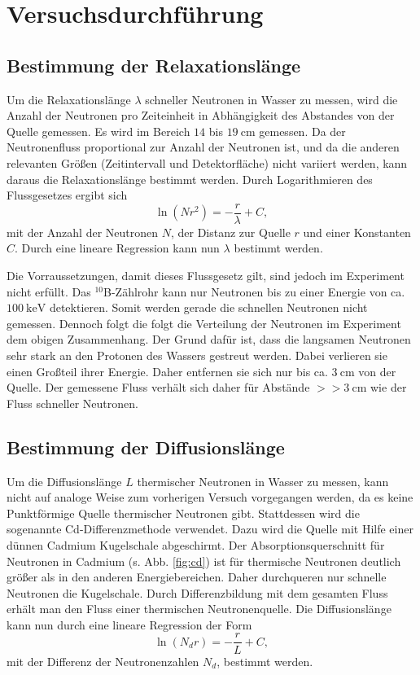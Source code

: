 \section{Versuchsdurchführung}

\subsection{Bestimmung der Relaxationslänge}

Um die Relaxationslänge $\lambda$ schneller Neutronen in Wasser zu messen, wird die Anzahl der Neutronen pro Zeiteinheit in Abhängigkeit des Abstandes von der Quelle gemessen. Es wird im Bereich $14$ bis $\SI{19}{\centi\metre}$ gemessen.
Da der Neutronenfluss proportional zur Anzahl der Neutronen ist, und da die anderen relevanten Größen (Zeitintervall und Detektorfläche) nicht variiert werden, kann daraus die Relaxationslänge bestimmt werden. Durch Logarithmieren des Flussgesetzes ergibt sich
\begin{equation}
 \ln\left(Nr^{2}\right) = -\frac{r}{\lambda} + C,
\end{equation}
mit der Anzahl der Neutronen $N$, der Distanz zur Quelle $r$ und einer Konstanten $C$. Durch eine lineare Regression kann nun $\lambda$ bestimmt werden.

Die Vorraussetzungen, damit dieses Flussgesetz gilt, sind jedoch im Experiment nicht erfüllt. Das $^{10}$B-Zählrohr kann nur Neutronen bis zu einer Energie von ca. $\SI{100}{\kilo\electronvolt}$ detektieren. Somit werden gerade die schnellen Neutronen nicht gemessen. Dennoch folgt die folgt die Verteilung der Neutronen im Experiment dem obigen Zusammenhang.
Der Grund dafür ist, dass die langsamen Neutronen sehr stark an den Protonen des Wassers gestreut werden. Dabei verlieren sie einen Großteil ihrer Energie. Daher entfernen sie sich nur bis ca. $\SI{3}{\centi\metre}$ von der Quelle. 
Der gemessene Fluss verhält sich daher für Abstände $>>\SI{3}{\centi\metre}$ wie der Fluss schneller Neutronen.

\subsection{Bestimmung der Diffusionslänge}

Um die Diffusionslänge $L$ thermischer Neutronen in Wasser zu messen, kann nicht auf analoge Weise zum vorherigen Versuch vorgegangen werden, da es keine Punktförmige Quelle thermischer Neutronen gibt.
Stattdessen wird die sogenannte Cd-Differenzmethode verwendet. Dazu wird die Quelle mit Hilfe einer dünnen Cadmium Kugelschale abgeschirmt. Der Absorptionsquerschnitt für Neutronen in Cadmium (s. Abb. \ref{fig:cd}) ist für thermische Neutronen deutlich größer als in den anderen Energiebereichen. Daher durchqueren nur schnelle Neutronen die Kugelschale.
Durch Differenzbildung mit dem gesamten Fluss erhält man den Fluss einer thermischen Neutronenquelle. Die Diffusionslänge kann nun durch eine lineare Regression der Form
\begin{equation}
 \ln\left(N_{d}r\right) = -\frac{r}{L} + C,
\end{equation}
mit der Differenz der Neutronenzahlen $N_{d}$, bestimmt werden.

